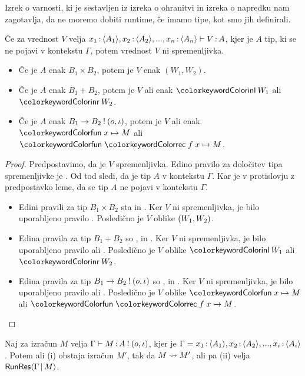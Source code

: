 Izrek o varnosti, ki je sestavljen iz izreka o ohranitvi in izreka o napredku nam zagotavlja, da ne moremo dobiti runtime, če imamo tipe, kot smo jih definirali.

\begin{lema}\label{lem:ni-spremenljivka}
	Če za vrednost $V$ velja $x_1 \mathinner{:} \langle A_1 \rangle, x_2 \mathinner{:} \langle A_2 \rangle, ..., x_n \mathinner{:} \langle A_n \rangle \vdash V \mathinner{:} A$, kjer je $A$ tip, ki se ne pojavi v kontekstu $\Gamma$, potem vrednost $V$ ni spremenljivka.
	\begin{itemize}
		\item Če je $A$ enak $B_1 \times B_2$, potem je $V$ enak $(W_1,W_2)$.
		\item Če je $A$ enak $B_1 + B_2$, potem je $V$ ali enak $\tminl{W_1}$ ali $\tminr{W_2}$.
		\item Če je $A$ enak $B_1 \to B_2 \mathbin{!} (o, \iota)$, potem je $V$ ali enak $\tmfunano{x}{M}$ ali $\tmfunrecano{f}{x}{M}$.
	\end{itemize}
\end{lema}

\begin{proof}
	Predpostavimo, da je $V$ spremenljivka. Edino pravilo za določitev tipa spremenljivke je . Od tod sledi, da je tip $A$ v kontekstu $\Gamma$. Kar je v protislovju z predpostavko leme, da se tip $A$ ne pojavi v kontekstu $\Gamma$.
	\begin{itemize}
		\item Edini pravili za tip $B_1 \times B_2$ sta  in . Ker $V$ ni spremenljivka, je bilo uporabljeno pravilo . Posledično je $V$ oblike $( W_1 , W_2 )$.
		
		\item Edina pravila za tip $B_1 + B_2$ so ,  in . Ker $V$ ni spremenljivka, je bilo uporabljeno pravilo  ali . Posledično je $V$ oblike $\tminl{W_1}$ ali $\tminr{W_2}$.
		
		\item Edina pravila za tip $B_1 \to B_2 \mathbin{!} (o, \iota)$ so ,  in . Ker $V$ ni spremenljivka, je bilo uporabljeno pravilo  ali . Posledično je $V$ oblike $\tmfunano{x}{M}$ ali $\tmfunrecano{f}{x}{M}$.
	\end{itemize}
\end{proof}


\begin{trditev}[o napredku]\label{trd:gamma-napredek}
	Naj za izračun $M$ velja $\Gamma \vdash M \mathinner{:} A \mathbin{!} (o, \iota)$, kjer je $\Gamma = x_1 \mathinner{:} \langle A_1 \rangle, x_2 \mathinner{:} \langle A_2 \rangle,..., x_i \mathinner{:} \langle A_i \rangle$. Potem ali (i) obstaja izračun $M'$, tak da $M \leadsto M'$, ali pa (ii) velja $\mathsf{RunRes}\langle\Gamma \,\vert\, M\rangle$.
\end{trditev}

